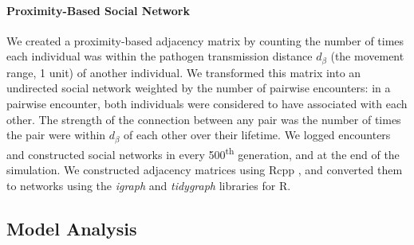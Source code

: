 \paragraph{Proximity-Based Social Network}

We created a proximity-based adjacency matrix by counting the number of times each individual was within the pathogen transmission distance $d_\beta$ (the movement range, 1 unit) of another individual.
We transformed this matrix into an undirected social network weighted by the number of pairwise encounters: in a pairwise encounter, both individuals were considered to have associated with each other.
The strength of the connection between any pair was the number of times the pair were within $d_\beta$ of each other over their lifetime.
We logged encounters and constructed social networks in every 500\textsuperscript{th} generation, and at the end of the simulation.
We constructed adjacency matrices using Rcpp \citep[][]{eddelbuettel2013}, and converted them to networks
using the \textit{igraph} \citep{csardi2006} and \textit{tidygraph} \citep{pedersen2020} libraries for R.

\subsection*{Model Analysis}

